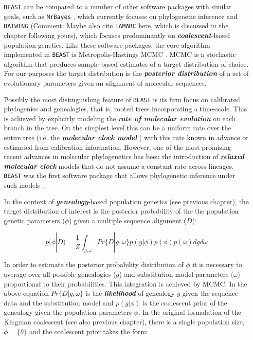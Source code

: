 \documentclass[cup7b, english]{cupbook}
\begin{document}
\texttt{BEAST} can be compared to a number of other software packages with
similar goals, such as \texttt{MrBayes} \cite{HR2001}, which
currently focuses on phylogenetic inference and \texttt{BATWING}
\cite{WWB2003} (Comment: Maybe also cite \texttt{LAMARC} here, which is discussed in the chapter following yours), which focuses predominantly on \textbf{\textit{coalescent}}-based population
genetics. Like these software packages, the core algorithm implemented
in \texttt{BEAST} is Metropolis-Hastings MCMC \cite{MRRTT1953,Hastings1970}.
MCMC is a stochastic algorithm that produces sample-based estimates
of a target distribution of choice. For our purposes the target distribution
is the  \textbf{\textit{posterior distribution}} of a set of evolutionary parameters
given an alignment of molecular sequences.

Possibly the most distinguishing feature of \texttt{BEAST} is its firm focus
on calibrated phylogenies and genealogies, that is, rooted trees incorporating
a time-scale. This is achieved by explicitly modeling the \textbf{\textit{rate of
molecular evolution}} on each branch in the tree. On the simplest level
this can be a uniform rate over the entire tree (i.e. the \textbf{\textit{molecular
clock model}} \cite{ZP1965}) with this rate known in advance or estimated
from calibration information. However, one of the most promising recent
advances in molecular phylogenetics has been the introduction of \textbf{\textit{relaxed
molecular clock}} models that do not assume a constant rate across
lineages\cite{TKP1998,YY2000,KTB2001,Sanderson2002,TK2002,AY2003}.
\texttt{BEAST} was the first software package that allows phylogenetic inference
under such models \cite{DHPR2006}.

In the context of \textbf{\textit{genealogy}}-based population genetics (see previous chapter), the target distribution of interest
is the posterior probability of the the population genetic parameters ($\phi$) given a
multiple sequence alignment ($D$):

\begin{equation}
p(\phi|D) = \frac{1}{Z}\int_{g,\omega} Pr\{D|g, \omega\}p(g|\phi)p(\phi)p(\omega)dgd\omega
\label{posterior-phi}
\end{equation}

In order to estimate the posterior probability distribution of $\phi$ it is necessary to average
over all possible genealogies ($g$) and substitution model parameters ($\omega$)
proportional to their probabilities. This integration is achieved by MCMC. In the above equation
$Pr\{D|g, \omega\}$ is the \textbf{\textit{likelihood}} of genealogy $g$ given the sequence data and the
substitution model \cite{F81} and $p(g|\phi)$ is the coalescent
prior of the genealogy given the population parameters $\phi$. In the original formulation
of the Kingman coalescent \cite{Kingman1982} (see also previous chapter), there is a single population size, $\phi = \{\theta\}$ and the
coalescent prior takes the form:
\end{document}
